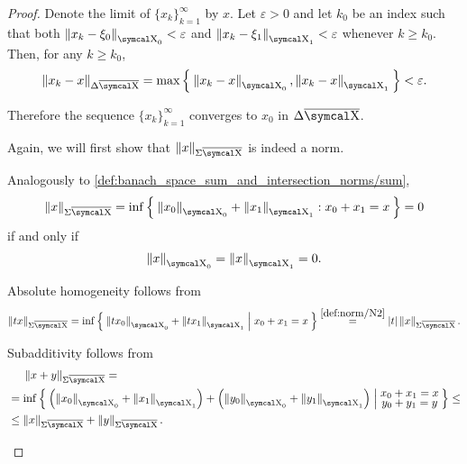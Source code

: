 \begin{proof}
  Denote the limit of \( \{ x_k \}_{k=1}^\infty \) by \( x \). Let \( \varepsilon > 0 \) and let \( k_0 \) be an index such that both \( \Norm{x_k - \xi_0}_{\CX_0} < \varepsilon \) and \( \Norm{x_k - \xi_1}_{\CX_1} < \varepsilon \) whenever \( k \geq k_0 \). Then, for any \( k \geq k_0 \),
  \begin{equation*}
    \Norm{x_k - x}_{\Delta \Ol{\CX}}
    =
    \max\Set{\Norm{x_k - x}_{\CX_0}, \Norm{x_k - x}_{\CX_1}}
    <
    \varepsilon.
  \end{equation*}

  Therefore the sequence \( \{ x_k \}_{k=1}^\infty \) converges to \( x_0 \) in \( \Delta \Ol{\CX} \).

   Again, we will first show that \( \Norm{x}_{\Sigma \Ol{\CX}} \) is indeed a norm.
  \begin{RefList}
     Analogously to \ref{def:banach_space_sum_and_intersection_norms/sum},
    \begin{equation*}
      \Norm{x}_{\Sigma \Ol{\CX}} = \inf \Set{ \Norm{x_0}_{\CX_0} + \Norm{x_1}_{\CX_1} : x_0 + x_1 = x } = 0
    \end{equation*}
    if and only if
    \begin{equation*}
      \Norm{x}_{\CX_0} = \Norm{x}_{\CX_1} = 0.
    \end{equation*}

     Absolute homogeneity follows from
    \begin{equation*}
      \Norm{tx}_{\Sigma \Ol{\CX}}
      =
      \inf \Set{ \Norm{tx_0}_{\CX_0} + \Norm{tx_1}_{\CX_1} | x_0 + x_1 = x }
      \overset {\ref{def:norm/N2}} =
      \Abs{t} \Norm{x}_{\Sigma \Ol{\CX}}.
    \end{equation*}

     Subadditivity follows from
    \begin{align*}
      &\phantom{{}={}}
      \Norm{x + y}_{\Sigma \Ol{\CX}}
      = \\ &=
      \inf \Set{ \left( \Norm{x_0}_{\CX_0} + \Norm{x_1}_{\CX_1} \right) + \left( \Norm{y_0}_{\CX_0} + \Norm{y_1}_{\CX_1} \right) | \substack{\textstyle{x_0 + x_1 = x} \\ \textstyle{y_0 + y_1 = y}} }
      \leq \\ &\leq
      \Norm{x}_{\Sigma \Ol{\CX}} + \Norm{y}_{\Sigma \Ol{\CX}}.
    \end{align*}
  \end{RefList}


\end{proof}
